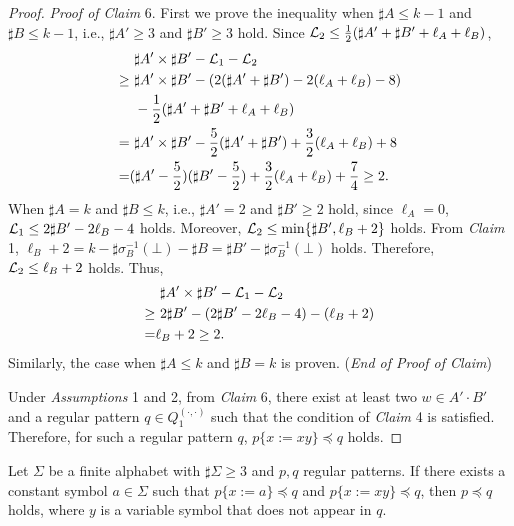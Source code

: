 \begin{proof}
\noindent
\textit{Proof of Claim} 6. 
First we prove the inequality when $\sharp A \leq k - 1$ and $\sharp B \leq k - 1$, i.e., $\sharp A' \geq 3$ and $\sharp B' \geq 3$ hold.
Since ${\cal L}_{2} \leq \frac{1}{2}(\sharp A' + \sharp B' + \ell_{A} + \ell_{B})$,
\begin{align*}
  &\ \sharp A' \times \sharp B' - {\cal L}_{1} - {\cal L}_{2}\\
\geq &\ \sharp A' \times \sharp B' - (2(\sharp A' + \sharp B') - 2(\ell_{A} + \ell_{B}) - 8)\\
  &\ - \frac{1}{2}(\sharp A' + \sharp B' + \ell_{A} + \ell_{B})\\
=    &\ \sharp A' \times \sharp B' - \frac{5}{2}(\sharp A' + \sharp B') + \frac{3}{2}(\ell_{A} + \ell_{B}) + 8\\
=    &(\sharp A' - \frac{5}{2})(\sharp B' - \frac{5}{2}) + \frac{3}{2}(\ell_{A} + \ell_{B}) + \frac{7}{4} \geq 2.
\end{align*}
When $\sharp A = k$ and $\sharp B \leq k$, i.e., $\sharp A' = 2$ and $\sharp B' \geq 2$ hold, since $\ell_{A} = 0$,
${\cal L}_{1} \leq 2\sharp B' - 2\ell_{B} -4$ holds.
Moreover, ${\cal L}_{2} \leq \min\{\sharp B', \ell_{B} + 2\}$ holds.
From \textit{Claim} 1, $\ell_B + 2 = k - \sharp\sigma^{-1}_{B}(\bot) - \sharp B = \sharp B' - \sharp\sigma^{-1}_{B}(\bot)$ holds. Therefore, ${\cal L}_{2} \leq \ell_{B} + 2$ holds.
Thus,
\begin{align*}
  &\ \sharp A' \times \sharp B' - {\cal L}_{1} - {\cal L}_{2}\\
\geq &\ 2\sharp B' - (2\sharp B' - 2\ell_{B} -4) - (\ell_{B} + 2)\\
= & \ell_B + 2 \geq 2.
\end{align*}
Similarly, the case when $\sharp A \leq k$ and $\sharp B = k$ is proven.
(\textit{End of Proof of Claim})

\smallskip

Under \textit{Assumptions} 1 and 2, from \textit{Claim} 6, there exist at least two $w\in A'\cdot B'$ and a regular pattern $q \in Q_{1}^{(\cdot,\cdot)}$ such that the condition of \textit{Claim} 4 is satisfied. 
Therefore, for such a regular pattern $q$, $p \{x := xy\} \preceq q$ holds.
\end{proof}


\begin{lem}\label{Sato1:Lemma15}%
Let $\Sigma$ be a finite alphabet with $\sharp \Sigma \ge 3$ and $p,q$ regular patterns.
If there exists a constant symbol $a \in \Sigma$ such that $p \{ x := a \} \preceq q$ and $p \{ x := xy \} \preceq q$, then $p \preceq q$ holds, where $y$ is a variable symbol that does not appear in $q$.
\end{lem}

